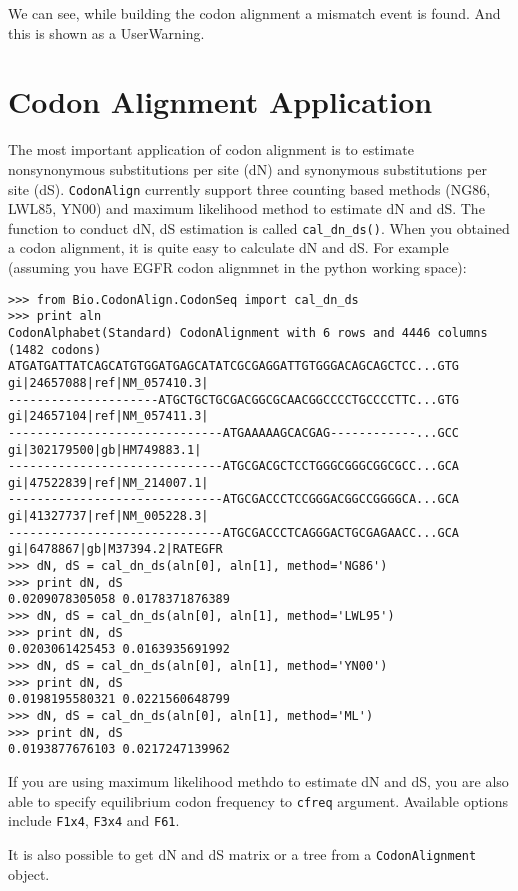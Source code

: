 We can see, while building the codon alignment a mismatch event is
found. And this is shown as a UserWarning.

\section{Codon Alignment Application}
\label{subsec:app}

The most important application of codon alignment is to estimate
nonsynonymous substitutions per site (dN) and synonymous substitutions
per site (dS). \verb|CodonAlign| currently support three counting
based methods (NG86, LWL85, YN00) and maximum likelihood method to
estimate dN and dS. The function to conduct dN, dS estimation is called
\verb|cal_dn_ds()|. When you obtained a codon alignment, it is quite
easy to calculate dN and dS. For example (assuming you have EGFR codon
alignmnet in the python working space):

\begin{verbatim}
>>> from Bio.CodonAlign.CodonSeq import cal_dn_ds
>>> print aln
CodonAlphabet(Standard) CodonAlignment with 6 rows and 4446 columns (1482 codons)
ATGATGATTATCAGCATGTGGATGAGCATATCGCGAGGATTGTGGGACAGCAGCTCC...GTG gi|24657088|ref|NM_057410.3|
---------------------ATGCTGCTGCGACGGCGCAACGGCCCCTGCCCCTTC...GTG gi|24657104|ref|NM_057411.3|
------------------------------ATGAAAAAGCACGAG------------...GCC gi|302179500|gb|HM749883.1|
------------------------------ATGCGACGCTCCTGGGCGGGCGGCGCC...GCA gi|47522839|ref|NM_214007.1|
------------------------------ATGCGACCCTCCGGGACGGCCGGGGCA...GCA gi|41327737|ref|NM_005228.3|
------------------------------ATGCGACCCTCAGGGACTGCGAGAACC...GCA gi|6478867|gb|M37394.2|RATEGFR
>>> dN, dS = cal_dn_ds(aln[0], aln[1], method='NG86')
>>> print dN, dS
0.0209078305058 0.0178371876389
>>> dN, dS = cal_dn_ds(aln[0], aln[1], method='LWL95')
>>> print dN, dS
0.0203061425453 0.0163935691992
>>> dN, dS = cal_dn_ds(aln[0], aln[1], method='YN00')
>>> print dN, dS
0.0198195580321 0.0221560648799
>>> dN, dS = cal_dn_ds(aln[0], aln[1], method='ML')
>>> print dN, dS
0.0193877676103 0.0217247139962
\end{verbatim}

If you are using maximum likelihood methdo to estimate dN and dS, you
are also able to specify equilibrium codon frequency to \texttt{cfreq}
argument. Available options include \texttt{F1x4}, \texttt{F3x4} and
\texttt{F61}.

It is also possible to get dN and dS matrix or a tree from a
\verb|CodonAlignment| object.


